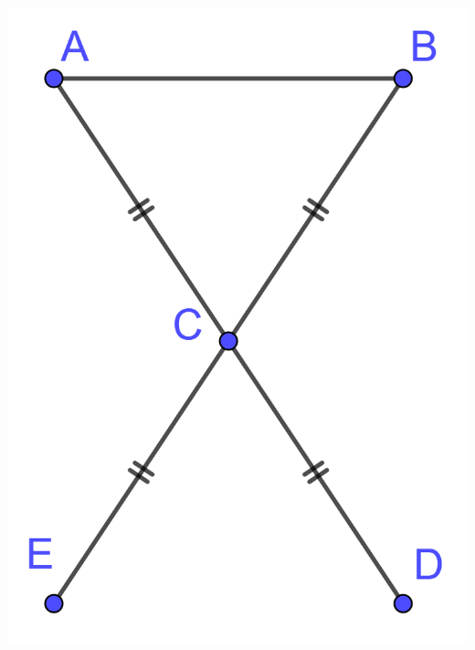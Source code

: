 \begin{multicols}{2}
\begin{center}
	\includegraphics[scale=0.14]{img/tabouret}
\end{center}
	
	
\end{multicols}
